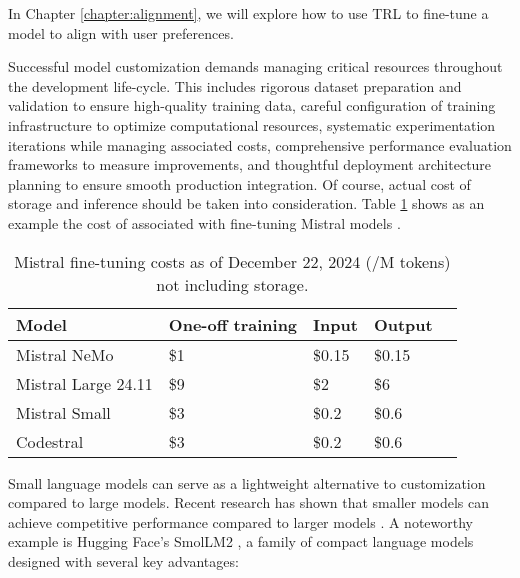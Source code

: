 In Chapter \ref{chapter:alignment}, we will explore how to use TRL to fine-tune a model to align with user preferences.

Successful model customization demands managing critical resources throughout the development life-cycle. This includes rigorous dataset preparation and validation to ensure high-quality training data, careful configuration of training infrastructure to optimize computational resources, systematic experimentation iterations while managing associated costs, comprehensive performance evaluation frameworks to measure improvements, and thoughtful deployment architecture planning to ensure smooth production integration. Of course, actual cost of storage and inference should be taken into consideration. Table \ref{tab:mistral_costs} shows as an example the cost of associated with fine-tuning Mistral models .

\begin{table}[H]
\centering
\caption{Mistral fine-tuning costs as of December 22, 2024 (/M tokens) not including storage.}
\label{tab:mistral_costs}
\begin{tabular}{lllll}
\hline
Model & One-off training & Input & Output \\
\hline
Mistral NeMo & \$1  & \$0.15 & \$0.15 \\
Mistral Large 24.11 & \$9  & \$2 & \$6 \\
Mistral Small & \$3  & \$0.2 & \$0.6 \\
Codestral & \$3 & \$0.2 & \$0.6 \\
\hline
\end{tabular}
\end{table}

Small language models can serve as a lightweight alternative to customization compared to large models. Recent research has shown that smaller models can achieve competitive performance compared to larger models . A noteworthy example is Hugging Face's SmolLM2 , a family of compact language models designed with several key advantages:

